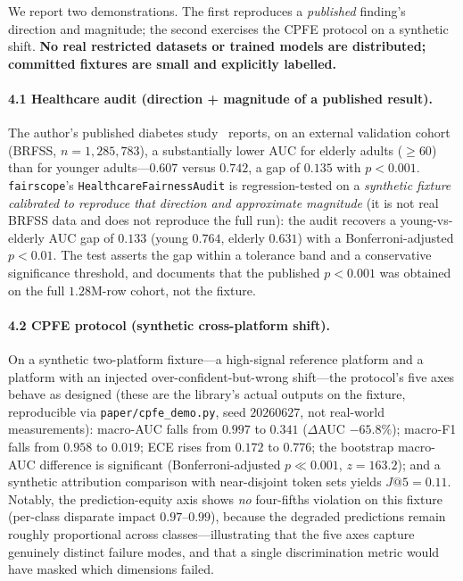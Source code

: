 \documentclass[11pt]{article}
\begin{document}
We report two demonstrations. The first reproduces a \emph{published} finding's direction and
magnitude; the second exercises the CPFE protocol on a synthetic shift. \textbf{No real
restricted datasets or trained models are distributed; committed fixtures are small and
explicitly labelled.}

\paragraph{4.1 Healthcare audit (direction + magnitude of a published result).} The author's
published diabetes study~\cite{diabetes} reports, on an external validation cohort (BRFSS,
$n=1{,}285{,}783$), a substantially lower AUC for elderly adults ($\geq 60$) than for younger
adults---$0.607$ versus $0.742$, a gap of $0.135$ with $p < 0.001$. \texttt{fairscope}'s
\texttt{HealthcareFairnessAudit} is regression-tested on a \emph{synthetic fixture calibrated
to reproduce that direction and approximate magnitude} (it is not real BRFSS data and does not
reproduce the full run): the audit recovers a young-vs-elderly AUC gap of $0.133$ (young
$0.764$, elderly $0.631$) with a Bonferroni-adjusted $p < 0.01$. The test asserts the gap
within a tolerance band and a conservative significance threshold, and documents that the
published $p < 0.001$ was obtained on the full $1.28$M-row cohort, not the fixture.

\paragraph{4.2 CPFE protocol (synthetic cross-platform shift).} On a synthetic two-platform
fixture---a high-signal reference platform and a platform with an injected
over-confident-but-wrong shift---the protocol's five axes behave as designed (these are the
library's actual outputs on the fixture, reproducible via \texttt{paper/cpfe\_demo.py}, seed
$20260627$, not real-world measurements): macro-AUC falls from $0.997$ to $0.341$
($\Delta$AUC $-65.8\%$); macro-F1 falls from $0.958$ to $0.019$; ECE rises from $0.172$ to
$0.776$; the bootstrap macro-AUC difference is significant (Bonferroni-adjusted $p \ll 0.001$,
$z = 163.2$); and a synthetic attribution comparison with near-disjoint token sets yields
$J@5 = 0.11$. Notably, the prediction-equity axis shows \emph{no} four-fifths violation on this
fixture (per-class disparate impact $0.97$--$0.99$), because the degraded predictions remain
roughly proportional across classes---illustrating that the five axes capture genuinely
distinct failure modes, and that a single discrimination metric would have masked which
dimensions failed.
\end{document}
